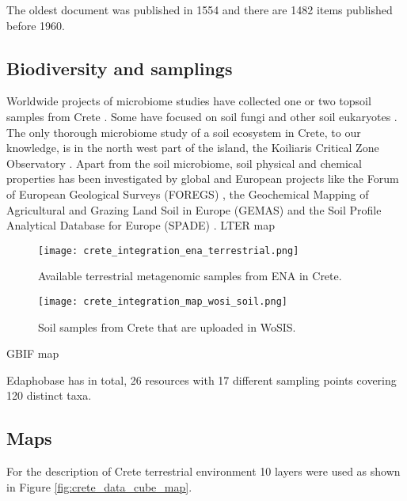 The oldest document was published in 1554 and there are 1482 items published before 1960.

\subsection{Biodiversity and samplings}

Worldwide projects of microbiome studies have collected one or two topsoil
samples from Crete \parencite{Vasar2022, Labouyrie2023, Bahram2018, Orgiazzi2018}.
Some have focused on soil fungi \parencite{Mikryukov2023, Davison2021, Tedersoo2021}
and other soil eukaryotes \parencite{Aslani2022}.
The only thorough microbiome study of a soil ecosystem in Crete, to our knowledge,
is in the north west part of the island, the Koiliaris Critical Zone Observatory \parencite{tsiknia2014}.
Apart from the soil microbiome, soil physical and chemical properties has been
investigated by global and European projects like the Forum of European Geological Surveys
(FOREGS) \parencite{nerc19017}, the Geochemical Mapping of Agricultural and Grazing Land
Soil in Europe (GEMAS) \parencite{REIMANN2018302} and the Soil Profile Analytical
Database for Europe (SPADE) \parencite{Hiederer2006}.
LTER map

\begin{figure}[hbt!] 
    \centering\texttt{[image: crete\_integration\_ena\_terrestrial.png]}
    \caption{Available terrestrial metagenomic samples from ENA in Crete.}
    \label{fig:isd_crete_ena}
\end{figure}


\begin{figure}[hbt!] 
    \centering\texttt{[image: crete\_integration\_map\_wosi\_soil.png]}
    \caption{Soil samples from Crete that are uploaded in WoSIS.}
    \label{fig:isd_crete_wosis}
\end{figure}

GBIF map 

Edaphobase has in total, 26 resources with 17 different sampling points covering 120 distinct taxa.



\subsection{Maps}

For the description of Crete terrestrial environment 10 layers were used as shown in Figure \ref{fig:crete_data_cube_map}.

